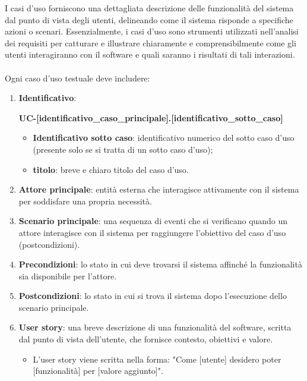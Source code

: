 I casi d'uso forniscono una dettagliata descrizione delle funzionalità del sistema dal punto di vista degli utenti, delineando come il sistema risponde a specifiche azioni o scenari.
Essenzialmente, i casi d'uso sono strumenti utilizzati nell'analisi dei requisiti per catturare e illustrare chiaramente e comprensibilmente come gli utenti interagiranno con il software e quali saranno i risultati di tali interazioni. \\
\\
Ogni caso d'uso testuale deve includere:
\begin{enumerate}
	\item \textbf{Identificativo}:
	      \begin{center}
		      \textbf{UC-[identificativo\_caso\_principale].[identificativo\_sotto\_caso]}
	      \end{center}
	      \begin{itemize}
		      \item \textbf{Identificativo sotto caso}: identificativo numerico del sotto caso d'uso (presente solo se si tratta di un sotto caso d'uso);
		      \item \textbf{titolo}: breve e chiaro titolo del caso d'uso.
	      \end{itemize}
	\item \textbf{Attore principale}: entità esterna che interagisce attivamente con il sistema per soddisfare una propria necessità.
	\item \textbf{Scenario principale}: una sequenza di eventi che si verificano quando un attore interagisce con il sistema per raggiungere l'obiettivo del caso d'uso (postcondizioni).
	\item \textbf{Precondizioni}: lo stato in cui deve trovarsi il sistema affinché la funzionalità sia disponibile per l'attore.
	\item \textbf{Postcondizioni}: lo stato in cui si trova il sistema dopo l'esecuzione dello scenario principale.
	\item \textbf{User story}: una breve descrizione di una funzionalità del software, scritta dal punto di vista dell'utente, che fornisce contesto, obiettivi e valore.
	      \begin{itemize}
		      \item L'user story viene scritta nella forma: "Come [utente] desidero poter [funzionalità] per [valore aggiunto]".
	      \end{itemize}
\end{enumerate}

